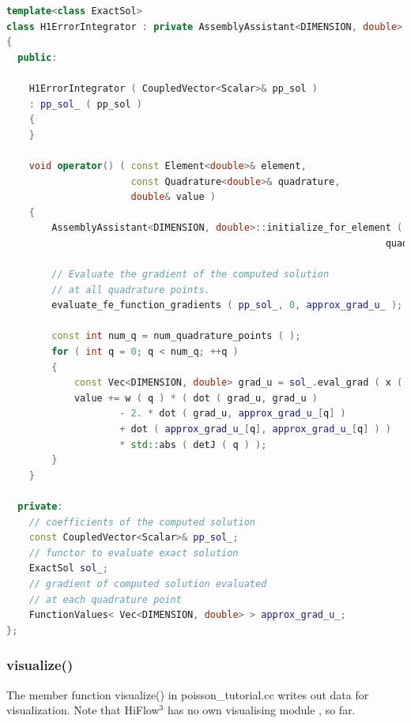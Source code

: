 \documentclass[a4paper, 11pt, twoside]{article}
\begin{document}
\begin{lstlisting}[language=C++, basicstyle={\footnotesize, \ttfamily}, keywordstyle=\color{blue}, numbers=none, tabsize=4]
template<class ExactSol>
class H1ErrorIntegrator : private AssemblyAssistant<DIMENSION, double>
{
  public:

    H1ErrorIntegrator ( CoupledVector<Scalar>& pp_sol )
    : pp_sol_ ( pp_sol )
    {
    }

    void operator() ( const Element<double>& element, 
                      const Quadrature<double>& quadrature,
                      double& value )
    {
        AssemblyAssistant<DIMENSION, double>::initialize_for_element ( element, 
                                                                   quadrature );

        // Evaluate the gradient of the computed solution 
        // at all quadrature points.
        evaluate_fe_function_gradients ( pp_sol_, 0, approx_grad_u_ );

        const int num_q = num_quadrature_points ( );
        for ( int q = 0; q < num_q; ++q )
        {
            const Vec<DIMENSION, double> grad_u = sol_.eval_grad ( x ( q ) );
            value += w ( q ) * ( dot ( grad_u, grad_u )
                    - 2. * dot ( grad_u, approx_grad_u_[q] )
                    + dot ( approx_grad_u_[q], approx_grad_u_[q] ) )
                    * std::abs ( detJ ( q ) );
        }
    }

  private:
    // coefficients of the computed solution
    const CoupledVector<Scalar>& pp_sol_;
    // functor to evaluate exact solution
    ExactSol sol_;
    // gradient of computed solution evaluated
    // at each quadrature point
    FunctionValues< Vec<DIMENSION, double> > approx_grad_u_;
};
\end{lstlisting}
%
%

\subsubsection{visualize()}\label{sec:visualize}
The member function visualize() in poisson\_tutorial.cc writes out data for visualization. Note that HiFlow$^3$ has no own visualising module  , so far.
\end{document}

